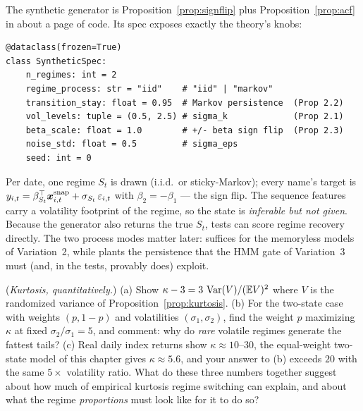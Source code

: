 \begin{codewalk}
The synthetic generator is Proposition~\ref{prop:signflip} plus
Proposition~\ref{prop:acf} in about a page of code. Its spec exposes exactly
the theory's knobs:

\begin{lstlisting}
@dataclass(frozen=True)
class SyntheticSpec:
    n_regimes: int = 2
    regime_process: str = "iid"    # "iid" | "markov"
    transition_stay: float = 0.95  # Markov persistence  (Prop 2.2)
    vol_levels: tuple = (0.5, 2.5) # sigma_k             (Prop 2.1)
    beta_scale: float = 1.0        # +/- beta sign flip  (Prop 2.3)
    noise_std: float = 0.5         # sigma_eps
    seed: int = 0
\end{lstlisting}

Per date, one regime $S_t$ is drawn (i.i.d.\ or sticky-Markov); every name's
target is $y_{i,t} = \beta_{S_t}^\top \bm{x}^{\text{snap}}_{i,t} +
\sigma_{S_t}\,\varepsilon_{i,t}$ with $\beta_2 = -\beta_1$ --- the sign
flip. The sequence features carry a volatility footprint of the regime, so
the state is \emph{inferable but not given}. Because the generator also
returns the true $S_t$, tests can score regime recovery directly. The two
process modes matter later:  suffices for the memoryless models
of Variation~2, while  plants the persistence that the HMM
gate of Variation~3 must (and, in the tests, provably does) exploit.
\end{codewalk}

\exercisehead

\begin{exercise}\label{ex:2-kurt}
(\emph{Kurtosis, quantitatively.}) (a) Show
$\kappa - 3 = 3\,\operatorname{Var}(V)/(\mathbb{E} V)^2$ where $V$ is the randomized variance of
Proposition~\ref{prop:kurtosis}. (b) For the two-state case with weights
$(p, 1{-}p)$ and volatilities $(\sigma_1, \sigma_2)$, find the weight $p$
maximizing $\kappa$ at fixed $\sigma_2/\sigma_1 = 5$, and comment: why do
\emph{rare} volatile regimes generate the fattest tails? (c) Real daily
index returns show $\kappa \approx 10$--$30$, the equal-weight two-state
model of this chapter gives $\kappa \approx 5.6$, and your answer to (b)
exceeds $20$ with the same $5\times$ volatility ratio. What do these three
numbers together suggest about how much of empirical kurtosis regime
switching can explain, and about what the regime \emph{proportions} must
look like for it to do so?
\end{exercise}

